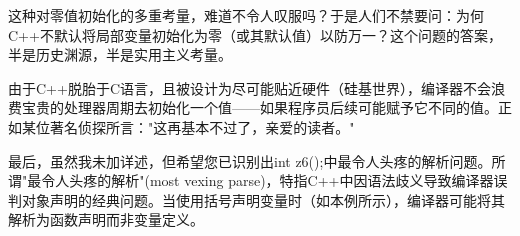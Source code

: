这种对零值初始化的多重考量，难道不令人叹服吗？于是人们不禁要问：为何C++不默认将局部变量初始化为零（或其默认值）以防万一？这个问题的答案，半是历史渊源，半是实用主义考量。

由于C++脱胎于C语言，且被设计为尽可能贴近硬件（硅基世界），编译器不会浪费宝贵的处理器周期去初始化一个值——如果程序员后续可能赋予它不同的值。正如某位著名侦探所言："这再基本不过了，亲爱的读者。"

最后，虽然我未加详述，但希望您已识别出int z6();中最令人头疼的解析问题。所谓"最令人头疼的解析"(most vexing parse)，特指C++中因语法歧义导致编译器误判对象声明的经典问题。当使用括号声明变量时（如本例所示），编译器可能将其解析为函数声明而非变量定义。












